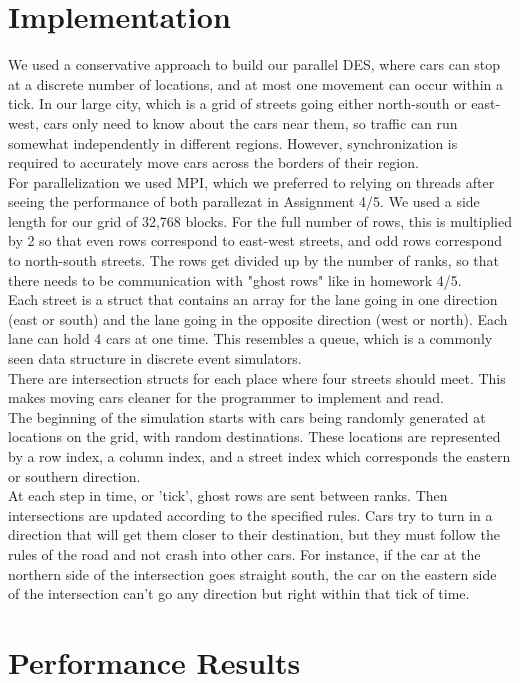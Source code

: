 \documentclass[10pt]{article}
\newcommand\tab[1][0.75cm]{\hspace*{#1}}
\begin{document}
\begin{multicols}{2}
\section{Implementation}
We used a conservative approach to build our parallel DES, where cars can stop at a discrete number of locations, and at most one movement can occur within a tick. In our large city, which is a grid of streets going either north-south or east-west, cars only need to know about the cars near them, so traffic can run somewhat independently in different regions. However, synchronization is required to accurately move cars across the borders of their region.\\
\tab For parallelization we used MPI, which we preferred to relying on threads after seeing the performance of both parallezat in Assignment 4/5. We used a side length for our grid of 32,768 blocks. For the full number of rows, this is multiplied by 2 so that even rows correspond to east-west streets, and odd rows correspond to north-south streets. The rows get divided up by the number of ranks, so that there needs to be communication with "ghost rows" like in homework 4/5.\\
\tab Each street is a struct that contains an array for the lane going in one direction (east or south) and the lane going in the opposite direction (west or north). Each lane can hold 4 cars at one time. This resembles a queue, which is a commonly seen data structure in discrete event simulators.\\
\tab There are intersection structs for each place where four streets should meet. This makes moving cars cleaner for the programmer to implement and read.\\
\tab The beginning of the simulation starts with cars being randomly generated at locations on the grid, with random destinations. These locations are represented by a row index, a column index, and a street index which corresponds the eastern or southern direction.\\
\tab At each step in time, or 'tick', ghost rows are sent between ranks. Then intersections are updated according to the specified rules. Cars try to turn in a direction that will get them closer to their destination, but they must follow the rules of the road and not crash into other cars. For instance, if the car at the northern side of the intersection goes straight south, the car on the eastern side of the intersection can't go any direction but right within that tick of time.

\section{Performance Results}


\end{multicols}
\end{document}
